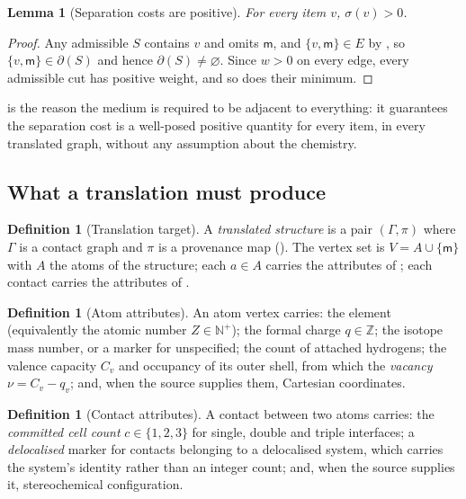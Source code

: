 \documentclass[11pt,twocolumn,a4paper]{article}
\theoremstyle{msthm}
\newtheorem{lemma}[theorem]{Lemma}
\theoremstyle{definition}
\newtheorem{definition}[theorem]{Definition}
\theoremstyle{remark}
\newcommand{\N}{\mathbb{N}}
\newcommand{\Z}{\mathbb{Z}}
\newcommand{\Gph}{\Gamma}
\newcommand{\V}{V}
\newcommand{\E}{E}
\newcommand{\wt}{w}
\newcommand{\med}{\mathsf{m}}
\newcommand{\Prov}{\pi}
\newcommand{\vac}{\nu}
\newcommand{\Capv}{C_v}
\begin{document}
\begin{lemma}[Separation costs are positive]
\label{lem:positive}
For every item $v$, $\sigma(v)>0$.
\end{lemma}

\begin{proof}
Any admissible $S$ contains $v$ and omits $\med$, and $\{v,\med\}\in\E$
by , so $\{v,\med\}\in\partial(S)$ and hence
$\partial(S)\ne\varnothing$. Since $\wt>0$ on every edge, every
admissible cut has positive weight, and so does their minimum.
\end{proof}

 is the reason the medium is required to be adjacent
to everything: it guarantees the separation cost is a well-posed
positive quantity for every item, in every translated graph, without any
assumption about the chemistry.

\subsection{What a translation must produce}

\begin{definition}[Translation target]
\label{def:target}
A \emph{translated structure} is a pair $(\Gph,\Prov)$ where $\Gph$ is a
contact graph and $\Prov$ is a provenance map (). The
vertex set is $\V=A\cup\{\med\}$ with $A$ the atoms of the structure;
each $a\in A$ carries the attributes of ; each contact
carries the attributes of .
\end{definition}

\begin{definition}[Atom attributes]
\label{def:attrs}
An atom vertex carries: the element (equivalently the atomic number
$Z\in\N^{+}$); the formal charge $q\in\Z$; the isotope mass number, or a
marker for unspecified; the count of attached hydrogens; the valence
capacity $\Capv$ and occupancy of its outer shell, from which the
\emph{vacancy} $\vac=\Capv-q_v$; and, when the source supplies them,
Cartesian coordinates.
\end{definition}

\begin{definition}[Contact attributes]
\label{def:bondattrs}
A contact between two atoms carries: the \emph{committed cell count}
$c\in\{1,2,3\}$ for single, double and triple interfaces; a
\emph{delocalised} marker for contacts belonging to a delocalised system,
which carries the system's identity rather than an integer count; and,
when the source supplies it, stereochemical configuration.
\end{definition}
\end{document}
